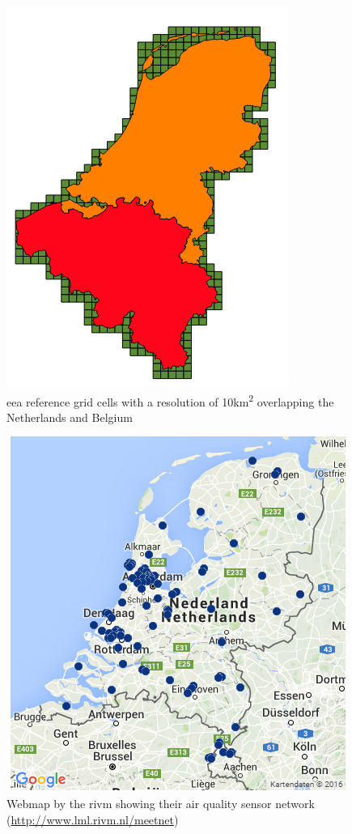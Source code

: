 \begin{figure}[!h]
	\centering
	\includegraphics[width=0.7\linewidth]{figs/EEA10km.png}
	\caption{\ac{eea} reference grid cells with a resolution of 10km\textsuperscript{2} overlapping the Netherlands and Belgium}
	\label{fig:10KM}
\end{figure}

\begin{figure}[!h]
	\centering
	\includegraphics[width=0.6\linewidth]{figs/RIVMSensors.png}
	\caption{Webmap by the \ac{rivm} showing their air quality sensor network (\url{http://www.lml.rivm.nl/meetnet})}
	\label{fig:RIVMSensor}
\end{figure}

